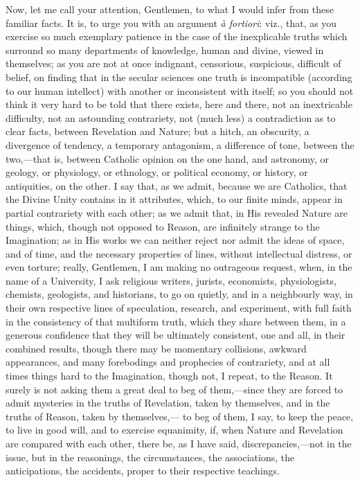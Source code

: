 Now, let me call your attention, Gentlemen, to what I would infer
from these familiar facts. It is, to urge you with an argument \emph{à
fortiori}: viz., that, as you exercise so much exemplary patience
in the case of the inexplicable truths which surround so many
departments of knowledge, human and divine, viewed in themselves; as
you are not at once indignant, censorious, suspicious, difficult of
belief, on finding that in the secular sciences one truth is
incompatible (according to our human intellect) with another or
inconsistent with itself; so you should not think it very hard
to be told that there exists, here and there, not an inextricable
difficulty, not an astounding contrariety, not (much less) a
contradiction as to clear facts, between Revelation and Nature; but a
hitch, an obscurity, a divergence of tendency, a temporary antagonism,
a difference of tone, between the two,—that is, between Catholic
opinion on the one hand, and astronomy, or geology, or physiology, or
ethnology, or political economy, or history, or antiquities, on the
other. I say that, as we admit, because we are Catholics, that the
Divine Unity contains in it attributes, which, to our finite minds,
appear in partial contrariety with each other; as we admit that, in
His revealed Nature are things, which, though not opposed to Reason,
are infinitely strange to the Imagination; as in His works we can
neither reject nor admit the ideas of space, and of time, and the
necessary properties of lines, without intellectual distress, or even
torture; really, Gentlemen, I am making no outrageous request, when,
in the name of a University, I ask religious writers, jurists,
economists, physiologists, chemists, geologists, and historians, to go
on quietly, and in a neighbourly way, in their own respective lines of
speculation, research, and experiment, with full faith in the
consistency of that multiform truth, which they share between them, in
a generous confidence that they will be ultimately consistent, one and
all, in their combined results, though there may be momentary
collisions, awkward appearances, and many forebodings and prophecies
of contrariety, and at all times things hard to the Imagination,
though not, I repeat, to the Reason. It surely is not asking them a
great deal to beg of them,—since they are forced to admit mysteries
in the truths of Revelation, taken by themselves, and in the truths of
Reason, taken by themselves,— to beg of them, I say, to keep
the peace, to live in good will, and to exercise equanimity, if, when
Nature and Revelation are compared with each other, there be, as I
have said, discrepancies,—not in the issue, but in the reasonings,
the circumstances, the associations, the anticipations, the accidents,
proper to their respective teachings.

